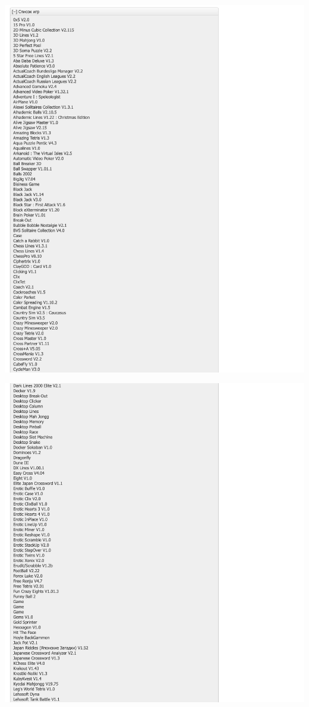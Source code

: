 \Continuing
\begin{center}
    \includegraphics[width=\textwidth]{igroteka-p2}
\end{center}
\WillContinue
\pagebreak

\Continuing
\begin{center}
    \includegraphics[width=\textwidth]{igroteka-p3}
\end{center}
\pagebreak

